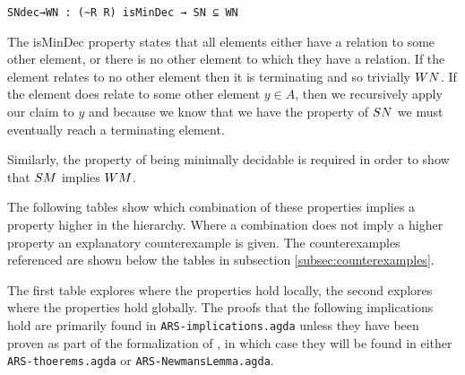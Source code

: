 \verb|SNdec→WN : (~R R) isMinDec → SN ⊆ WN| \footnotemark[1]


The isMinDec property states that all elements either have a relation to some other element, or 
there is no other element to which they have a relation. If the element relates to no other element then it is terminating 
and so trivially $\WN$. If the element does relate to some other element $y \in A$, then we recursively apply our claim to 
$y$ and because we know that we have the property of $\SN$ we must eventually reach a terminating element. 

Similarly, the property of being minimally decidable is required in order to show that $\SM$ implies $\WM$.

The following tables show which combination of these properties implies a property higher in the hierarchy. Where a combination 
does not imply a higher property an explanatory counterexample is given. The counterexamples referenced are shown below the tables in subsection \ref{subsec:counterexamples}. 

The first table explores where the properties hold locally, the second explores where the properties hold globally. The proofs that the 
following implications hold are primarily found in \texttt{ARS-implications.agda} unless they have been proven as part of the formalization 
of \terese, in which case they will be found in either \texttt{ARS-thoerems.agda} or \texttt{ARS-NewmansLemma.agda}.

